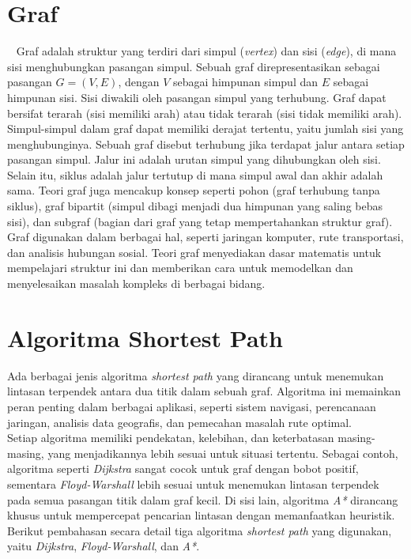 \section{Graf}
\label{sec:graph}
~\cite{Diestel:17:graph}
Graf adalah struktur yang terdiri dari simpul (\textit{vertex}) dan sisi (\textit{edge}), di mana sisi menghubungkan pasangan simpul. Sebuah graf direpresentasikan sebagai pasangan $G=(V,E)$, dengan $V$ sebagai himpunan simpul dan $E$ sebagai himpunan sisi. Sisi diwakili oleh pasangan simpul yang terhubung. Graf dapat bersifat terarah (sisi memiliki arah) atau tidak terarah (sisi tidak memiliki arah).
\\
Simpul-simpul dalam graf dapat memiliki derajat tertentu, yaitu jumlah sisi yang menghubunginya. Sebuah graf disebut terhubung jika terdapat jalur antara setiap pasangan simpul. Jalur ini adalah urutan simpul yang dihubungkan oleh sisi. Selain itu, siklus adalah jalur tertutup di mana simpul awal dan akhir adalah sama. Teori graf juga mencakup konsep seperti pohon (graf terhubung tanpa siklus), graf bipartit (simpul dibagi menjadi dua himpunan yang saling bebas sisi), dan subgraf (bagian dari graf yang tetap mempertahankan struktur graf).
\\
Graf digunakan dalam berbagai hal, seperti jaringan komputer, rute transportasi, dan analisis hubungan sosial. Teori graf menyediakan dasar matematis untuk mempelajari struktur ini dan memberikan cara untuk memodelkan dan menyelesaikan masalah kompleks di berbagai bidang.

\section{Algoritma Shortest Path}
\label{sec:algoritmasp}
Ada berbagai jenis algoritma \textit{shortest path} yang dirancang untuk menemukan lintasan terpendek antara dua titik dalam sebuah graf. Algoritma ini memainkan peran penting dalam berbagai aplikasi, seperti sistem navigasi, perencanaan jaringan, analisis data geografis, dan pemecahan masalah rute optimal.
\\
Setiap algoritma memiliki pendekatan, kelebihan, dan keterbatasan masing-masing, yang menjadikannya lebih sesuai untuk situasi tertentu. Sebagai contoh, algoritma seperti \textit{Dijkstra} sangat cocok untuk graf dengan bobot positif, sementara \textit{Floyd-Warshall} lebih sesuai untuk menemukan lintasan terpendek pada semua pasangan titik dalam graf kecil. Di sisi lain, algoritma \textit{A*} dirancang khusus untuk mempercepat pencarian lintasan dengan memanfaatkan heuristik. Berikut pembahasan secara detail tiga algoritma \textit{shortest path} yang digunakan, yaitu \textit{Dijkstra}, \textit{Floyd-Warshall}, dan \textit{A*}.

